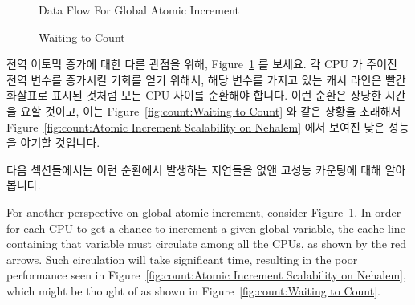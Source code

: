 \begin{figure}[tb]
\centering
{}
\caption{Data Flow For Global Atomic Increment}
\label{fig:count:Data Flow For Global Atomic Increment}
\end{figure}

\begin{figure}[tb]
\centering
{}
\caption{Waiting to Count}
\end{figure}

전역 어토믹 증가에 대한 다른 관점을 위해,
Figure~\ref{fig:count:Data Flow For Global Atomic Increment} 를 보세요.
각 CPU 가 주어진 전역 변수를 증가시킬 기회를 얻기 위해서, 해당 변수를 가지고
있는 캐시 라인은 빨간 화살표로 표시된 것처럼 모든 CPU 사이를 순환해야 합니다.
이런 순환은 상당한 시간을 요할 것이고, 이는
Figure~\ref{fig:count:Waiting to Count} 와 같은 상황을 초래해서
Figure~\ref{fig:count:Atomic Increment Scalability on Nehalem} 에서 보여진 낮은
성능을 야기할 것입니다.

다음 섹션들에서는 이런 순환에서 발생하는 지연들을 없앤 고성능 카운팅에 대해
알아봅니다.
\iffalse

For another perspective on global atomic increment, consider
Figure~\ref{fig:count:Data Flow For Global Atomic Increment}.
In order for each CPU to get a chance to increment a given
global variable, the cache line containing that variable must
circulate among all the CPUs, as shown by the red arrows.
Such circulation will take significant time, resulting in
the poor performance seen in
Figure~\ref{fig:count:Atomic Increment Scalability on Nehalem},
which might be thought of as shown in
Figure~\ref{fig:count:Waiting to Count}.

